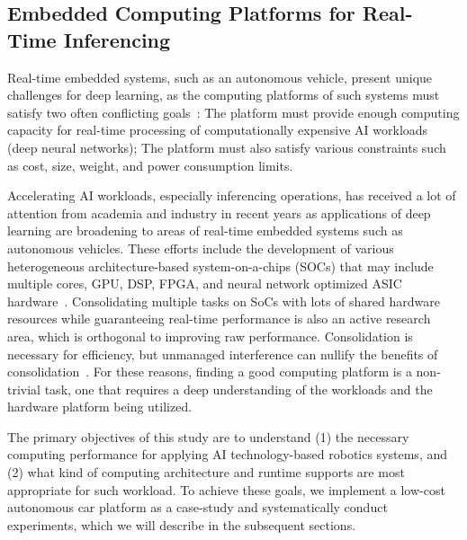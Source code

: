 \subsection{Embedded Computing Platforms for Real-Time Inferencing}
Real-time embedded systems, such as an autonomous vehicle, present
unique challenges for deep learning, as the computing platforms of such
systems must satisfy two often conflicting goals~\cite{Otterness2017}:
The platform must provide 
enough computing capacity for real-time processing of computationally
expensive AI workloads (deep neural networks);
The platform must also satisfy various
constraints such as cost, size, weight, and power consumption limits.

Accelerating AI workloads, especially inferencing
operations, has received a lot of attention from academia and industry
in recent years as applications of deep learning are broadening to
areas of real-time embedded systems such as autonomous vehicles. These
efforts include the development of various heterogeneous architecture-based 
system-on-a-chips (SOCs) that may include multiple cores, GPU,
DSP, FPGA, and neural network optimized ASIC hardware~\cite{Jouppi2017}.
Consolidating multiple tasks on SoCs with lots of shared hardware
resources while guaranteeing real-time performance is also an active
research area, which is orthogonal to improving raw
performance. Consolidation is necessary for efficiency, but unmanaged 
interference can nullify the benefits of consolidation~\cite{Kim2016}.
For these reasons, finding a good computing platform is a
non-trivial task, one that requires a deep understanding of the
workloads and the hardware platform being utilized.

The primary objectives of this study are to understand (1) the
necessary computing performance for applying AI technology-based
robotics systems, and (2) what kind of computing architecture and
runtime supports are most appropriate for such workload. To
achieve these goals, we implement a low-cost autonomous car platform
as a case-study and systematically conduct experiments, which we will 
describe in the subsequent sections.
